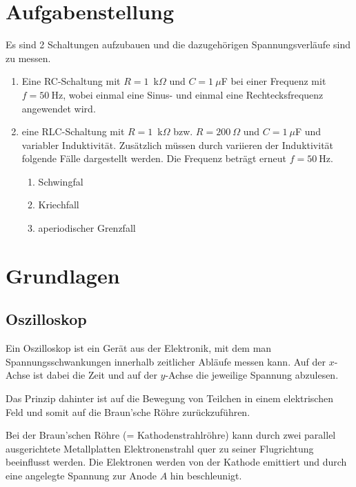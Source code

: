 \documentclass{article}
\begin{document}
\parindent0cm




\pagestyle{fancy}

\section{Aufgabenstellung}

Es sind 2 Schaltungen aufzubauen und die dazugehörigen Spannungsverläufe sind zu messen.

\begin{enumerate}
\item Eine RC-Schaltung mit $R=1$~k$\Omega$ und $C=1~\mu$F bei einer Frequenz mit $f=50~$Hz, wobei einmal eine Sinus- und einmal eine Rechtecksfrequenz angewendet wird.

\item eine RLC-Schaltung mit $R=1$~k$\Omega$ bzw. $R=200~\Omega$ und $C=1~\mu$F und variabler Induktivität. Zusätzlich müssen durch variieren der Induktivität folgende Fälle dargestellt werden. Die Frequenz beträgt erneut $f=50~$Hz.
\begin{enumerate}
\item Schwingfal
\item Kriechfall
\item aperiodischer Grenzfall
\end{enumerate}
\end{enumerate}




\section{Grundlagen}

\subsection{Oszilloskop}

Ein Oszilloskop ist ein Gerät aus der Elektronik, mit dem man Spannungsschwankungen innerhalb zeitlicher Abläufe messen kann. Auf der $x$-Achse ist dabei die Zeit und auf der $y$-Achse die jeweilige Spannung abzulesen.

Das Prinzip dahinter ist auf die Bewegung von Teilchen in einem elektrischen Feld und somit auf die Braun'sche Röhre zurückzuführen.

Bei der Braun'schen Röhre (= Kathodenstrahlröhre) kann durch zwei parallel ausgerichtete Metallplatten Elektronenstrahl quer zu seiner Flugrichtung beeinflusst werden. Die Elektronen werden von der Kathode emittiert und durch eine angelegte Spannung zur Anode $A$ hin beschleunigt.
\end{document}
